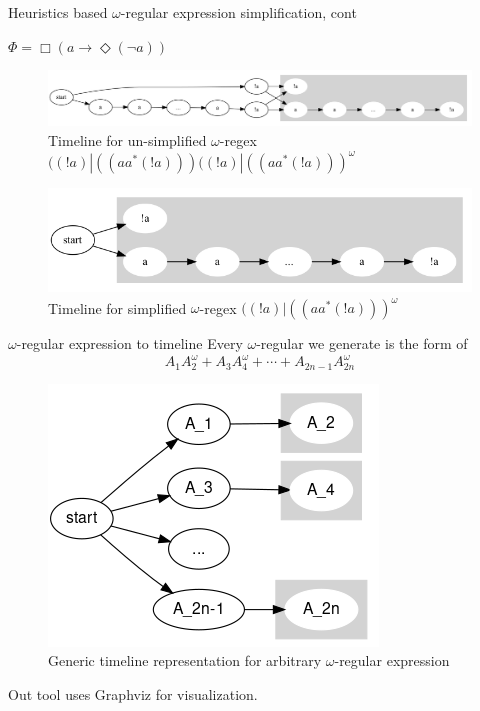 \documentclass[handout]{beamer}
\newcommand{\alwaysf}{\Box}
\newcommand{\evenf}{\Diamond}
\newcommand{\limplies}{\rightarrow}
\begin{document}
\begin{frame}{Heuristics based $\omega$-regular expression simplification, cont}
    \begin{example}
        $\Phi = \alwaysf (a \limplies \evenf (\neg a))$
    \begin{figure}
        \centering
        \includegraphics[scale=0.25]{examples/ex9/ex9-unsimplified.gv.png}
        \caption{Timeline for un-simplified $\omega$-regex $((!a) | ((aa^*(!a)))((!a) | ((aa^*(!a)))^{\omega}$}
    \end{figure}
    \begin{figure}
        \centering
        \includegraphics[scale=0.25]{examples/ex9/ex9.gv.png}
        \caption{Timeline for simplified $\omega$-regex $((!a) | ((aa^*(!a)))^{\omega}$}
    \end{figure}
    \end{example}
\end{frame}

\begin{frame}{$\omega$-regular expression to timeline}
    Every $\omega$-regular we generate is the form of 
    \[
        A_1A_2^{\omega} + A_3A_4^{\omega} + \cdots + A_{2n-1}A_{2n}^{\omega}
    \]
    \begin{figure}
        \centering
        \includegraphics[scale=0.4]{img/timeline.png}
        \caption{Generic timeline representation for arbitrary $\omega$-regular expression}
    \end{figure}
    Out tool uses Graphviz \cite{Ellson2001GraphvizO} for visualization. 
\end{frame}
\end{document}
